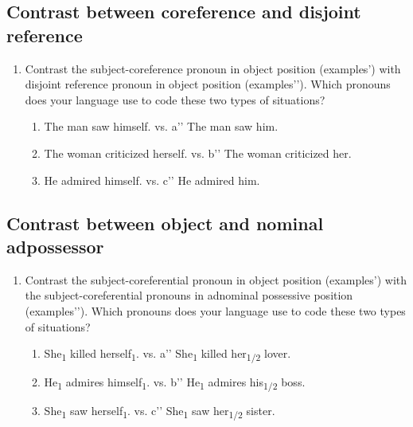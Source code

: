 \documentclass[output=paper]{langscibook}
\begin{document}
\subsection*{Contrast between coreference and disjoint reference}
\begin{enumerate}[resume]
\item Contrast the subject-coreference pronoun in object position (examples’) with disjoint reference pronoun in object position (examples’’). Which pronouns does your language use to code these two types of situations? 

\begin{enumerate}[label=\alph*'.]
\item The man saw himself.     vs.   a’’ The man saw him. 
\item The woman criticized herself.   vs.   b’’ The woman criticized her. 
\item He admired himself.     vs.   c’’ He admired him. 
\end{enumerate}
\end{enumerate}

\subsection*{Contrast between object and nominal adpossessor}
\begin{enumerate}[resume]
\item Contrast the subject-coreferential pronoun in object position (examples') with the subject-coreferential pronouns in adnominal possessive position (examples’’). Which pronouns does your language use to code these two types of situations? 

\begin{enumerate}[label=\alph*'.]
\item She\textsubscript{1} killed herself\textsubscript{1}.    vs.   a’’ She\textsubscript{1} killed her\textsubscript{1/2} lover. 
\item He\textsubscript{1} admires himself\textsubscript{1}.  vs.   b’’ He\textsubscript{1} admires his\textsubscript{1/2} boss. 
\item She\textsubscript{1} saw herself\textsubscript{1}.    vs.   c’’ She\textsubscript{1} saw her\textsubscript{1/2} sister. 
\end{enumerate}
\end{enumerate}
\end{document}
